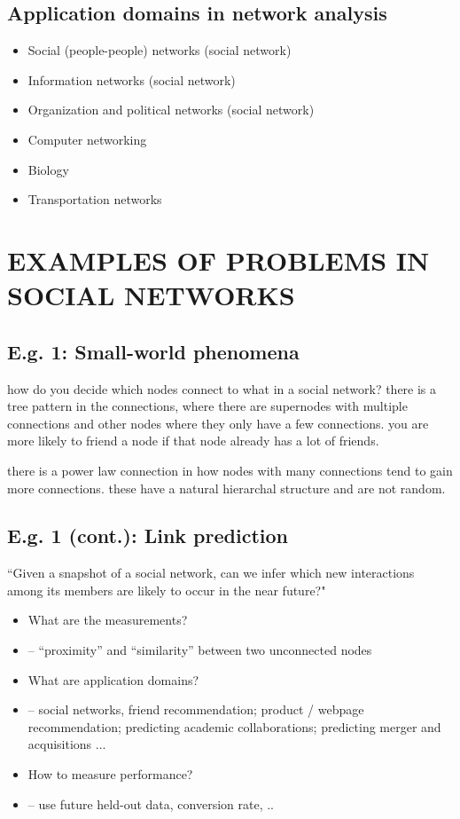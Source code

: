 \documentclass[11pt]{article}
\theoremstyle{definition}
\begin{document}
\subsection{Application domains in network analysis}
\begin{itemize}
    \item Social (people-people) networks (social network)
    \item Information networks (social network)
    \item Organization and political networks (social network)
    \item Computer networking
    \item Biology
    \item Transportation networks
\end{itemize}

\section{EXAMPLES OF PROBLEMS IN
SOCIAL NETWORKS}
\subsection{E.g. 1: Small-world phenomena}
how do you decide which nodes connect to what in a social network?
there is a tree pattern in the connections, where there are supernodes with multiple connections
and other nodes where they only have a few connections.
you are more likely to friend a node if that node already has a lot of friends.

there is a power law connection in how nodes with many connections tend to gain more 
connections. these have a natural hierarchal structure and are not random.
\subsection{E.g. 1 (cont.): Link prediction}
“Given a snapshot of a social network, can we infer which new interactions
among its members are likely to occur in the near future?"
\begin{itemize}
    \item What are the measurements?
    \item -- “proximity” and “similarity” between two unconnected nodes
    \item What are application domains?
    \item -- social networks, friend recommendation; product / webpage
    recommendation; predicting academic collaborations; predicting merger and
    acquisitions ...
    \item How to measure performance?
    \item -- use future held-out data, conversion rate, ..
\end{itemize}
\end{document}
